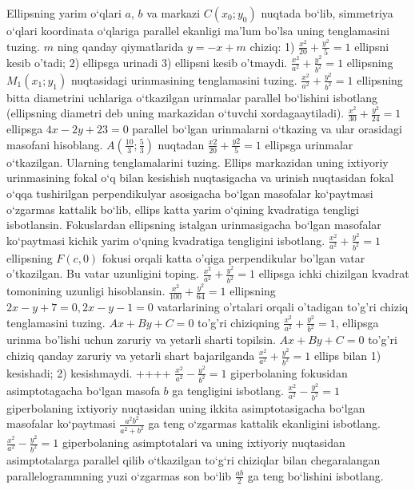 Ellipsning yarim o‘qlari $a$, $b$ va markazi $C\left(x_0; y_0\right)$ nuqtada bo‘lib, simmetriya o‘qlari koordinata o‘qlariga parallel ekanligi ma’lum bo'lsa uning tenglamasini tuzing.
$m$ ning qanday qiymatlarida $y=-x+m$ chiziq: 1) $\frac{x^2}{20}+\frac{y^2}{5}=1$ ellipsni kesib o'tadi; 2) ellipsga urinadi 3) ellipsni kesib o'tmaydi.
$\frac{x^2}{a^2}+\frac{y^2}{b^2}=1$ ellipsning $M_1(x_1; y_1)$ nuqtasidagi urinmasining tenglamasini tuzing.
$\frac{x^2}{a^2}+\frac{y^2}{b^2}=1$ ellipsning bitta diametrini uchlariga o‘tkazilgan urinmalar parallel bo‘lishini isbotlang (ellipsning diametri deb uning markazidan o‘tuvchi xordagaaytiladi).
$\frac{x^2}{30}+\frac{y^2}{24}=1$ ellipsga $4x-2y+23=0$ parallel bo‘lgan urinmalarni o‘tkazing va ular orasidagi masofani hisoblang.
$A\left(\frac{10}{3}; \frac{5}{3}\right)$ nuqtadan $\frac{x2}{20}+\frac{y2}{5}=1$ ellipsga urinmalar o‘tkazilgan. Ularning tenglamalarini tuzing.
Ellips markazidan uning ixtiyoriy urinmasining fokal o‘q bilan kesishish nuqtasigacha va urinish nuqtasidan fokal o‘qqa tushirilgan perpendikulyar asosigacha bo‘lgan masofalar ko‘paytmasi o‘zgarmas kattalik bo‘lib, ellips katta yarim o‘qining kvadratiga tengligi isbotlansin.
Fokuslardan ellipsning istalgan urinmasigacha bo‘lgan masofalar ko‘paytmasi kichik yarim o‘qning kvadratiga tengligini isbotlang.
$\frac{x^2}{a^2}+\frac{y^2}{b^2}=1$ ellipsning $F(c, 0)$ fokusi orqali katta o'qiga perpendikular bo'lgan vatar o'tkazilgan. Bu vatar uzunligini toping.
$\frac{x^2}{a^2}+\frac{y^2}{b^2}=1$ ellipsga ichki chizilgan kvadrat tomonining uzunligi hisoblansin.
$\frac{x^2}{100}+\frac{y^2}{64}=1$ ellipsning $2 x-y+7=0,2 x-y-1=0$ vatarlarining o'rtalari orqali o'tadigan to'g'ri chiziq tenglamasini tuzing.
$A x+B y+C=0$ to'g'ri chiziqning $\frac{x^2}{a^2}+\frac{y^2}{b^2}=1$, ellipsga urinma bo'lishi uchun zaruriy va yetarli sharti topilsin.
$A x+B y+C=0$ to'g'ri chiziq qanday zaruriy va yetarli shart bajarilganda $\frac{x^2}{a^2}+\frac{y^2}{b^2}=1$ ellips bilan 1) kesishadi; 2) kesishmaydi.
++++
$\frac{x^2}{a^2}-\frac{y^2}{b^2}=1$ giperbolaning fokusidan asimptotagacha bo‘lgan masofa $b$ ga tengligini isbotlang.
$\frac{x^2}{a^2}-\frac{y^2}{b^2}=1$ giperbolaning ixtiyoriy nuqtasidan uning ikkita asimptotasigacha bo‘lgan masofalar ko‘paytmasi $\frac{a^2 b^2}{a^2+b^2}$ ga teng o‘zgarmas kattalik ekanligini isbotlang.
$\frac{x^2}{a^2}-\frac{y^2}{b^2}=1$ giperbolaning asimptotalari va uning ixtiyoriy nuqtasidan asimptotalarga parallel qilib o‘tkazilgan to‘g‘ri chiziqlar bilan chegaralangan parallelogrammning yuzi o‘zgarmas son bo‘lib $\frac{a b}{2}$ ga teng bo‘lishini isbotlang.
